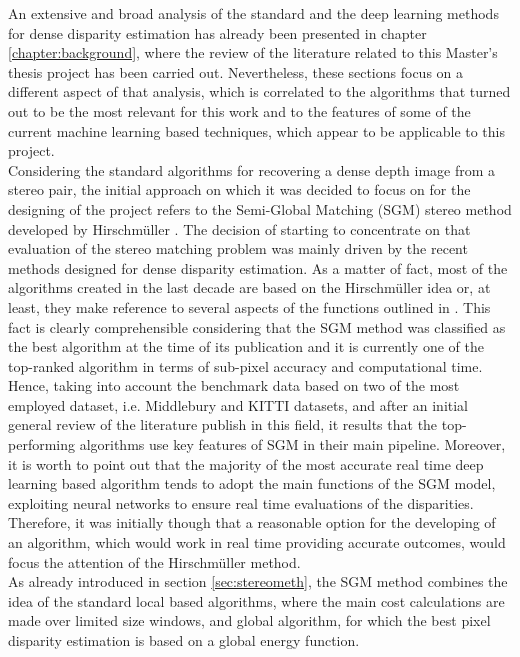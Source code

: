 An extensive and broad analysis of the standard and the deep learning methods for dense disparity estimation has already been presented in chapter \ref{chapter:background}, where the review of the literature related to this Master's thesis project has been carried out.
Nevertheless, these sections focus on a different aspect of that analysis, which is correlated to the algorithms that turned out to be the most relevant for this work and to the features of some of the current machine learning based techniques, which appear to be applicable to this project.\\
Considering the standard algorithms for recovering a dense depth image from a stereo pair, the initial approach on which it was decided to focus on for the designing of the project refers to the Semi-Global Matching (SGM) stereo method developed by Hirschm\"{u}ller \cite{Hirschmuller2008}.
The decision of starting to concentrate on that evaluation of the stereo matching problem was mainly driven by the recent methods designed for dense disparity estimation.
As a matter of fact, most of the algorithms created in the last decade are based on the Hirschm\"{u}ller idea or, at least, they make reference to several aspects of the functions outlined in \cite{Hirschmuller2008}.
This fact is clearly comprehensible considering that the SGM method was classified as the best algorithm at the time of its publication and it is currently one of the top-ranked algorithm in terms of sub-pixel accuracy and computational time.
Hence, taking into account the benchmark data based on two of the most employed dataset, i.e. Middlebury \cite{Scharstein2014} and KITTI \cite{geiger2013vision} datasets, and after an initial general review of the literature publish in this field, it results that the top-performing algorithms use key features of SGM in their main pipeline. 
Moreover, it is worth to point out that the majority of the most accurate real time deep learning based algorithm tends to adopt the main functions of the SGM model, exploiting neural networks to ensure real time evaluations of the disparities.
Therefore, it was initially though that a reasonable option for the developing of an algorithm, which would work in real time providing accurate outcomes, would focus the attention of the Hirschm\"{u}ller method.\\
As already introduced in section \ref{sec:stereometh}, the SGM method combines the idea of the standard local based algorithms, where the main cost calculations are made over limited size windows, and global algorithm, for which the best pixel disparity estimation is based on a global energy function. 
